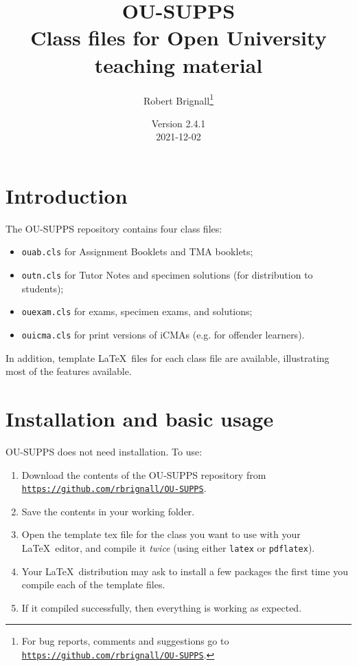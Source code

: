 \documentclass[a4paper]{ltxguide}
\title{\textsf{OU-SUPPS}\\Class files for Open University teaching material}
\author{Robert Brignall\footnote{For bug reports, comments and
suggestions go to \href{https://github.com/rbrignall/OU-SUPPS}%
{\texttt{https://github.com/rbrignall/OU-SUPPS}}.}}
\date{Version 2.4.1\\2021-12-02}
\newcommand\3{\unskip\enspace\fbox{\fontsize{4}{4}\selectfont NEW 3.0}}
\begin{document}
\maketitle

\tableofcontents

\section{Introduction}

The \textsf{OU-SUPPS} repository contains four class files:
\begin{itemize}
\item \texttt{ouab.cls} for Assignment Booklets and TMA booklets;
\item \texttt{outn.cls} for Tutor Notes and specimen solutions (for distribution to students);
\item \texttt{ouexam.cls} for exams, specimen exams, and solutions;
\item \texttt{ouicma.cls} for print versions of iCMAs (e.g. for offender learners).
\end{itemize}

In addition, template \LaTeX\ files for each class file are available, illustrating most of the features available.

\section{Installation and basic usage}

\textsf{OU-SUPPS} does not need installation. To use:

\begin{enumerate}
\item Download the contents of the \textsf{OU-SUPPS} repository from \href{https://github.com/rbrignall/OU-SUPPS}%
{\texttt{https://github.com/rbrignall/OU-SUPPS}}.
\item Save the contents in your working folder.
\item Open the template tex file for the class you want to use with your \LaTeX\ editor, and compile it \emph{twice} (using either \texttt{latex} or \texttt{pdflatex}). 
\item Your \LaTeX\ distribution may ask to install a few packages the first time you compile each of the template files.
\item If it compiled successfully, then everything is working as expected.
\end{enumerate}
\end{document}
